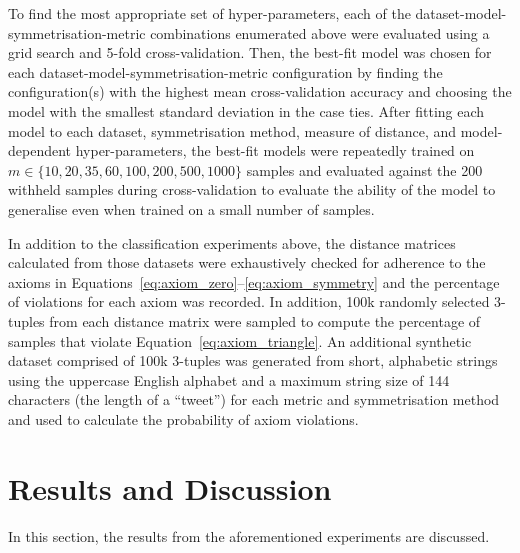\documentclass[preprint,12pt]{article}
\begin{document}
To find the most appropriate set of hyper-parameters, each of the dataset-model-symmetrisation-metric combinations enumerated above were evaluated using a grid search and 5-fold cross-validation.
Then, the best-fit model was chosen for each dataset-model-symmetrisation-metric configuration by finding the configuration(s) with the highest mean cross-validation accuracy and choosing the model with the smallest standard deviation in the case ties.
After fitting each model to each dataset, symmetrisation method, measure of distance, and model-dependent hyper-parameters, the best-fit models were repeatedly trained on $m \in \{10, 20, 35, 60, 100, 200, 500, 1000\}$ samples and evaluated against the 200 withheld samples during cross-validation to evaluate the ability of the model to generalise even when trained on a small number of samples.

In addition to the classification experiments above, the distance matrices calculated from those datasets were exhaustively checked for adherence to the axioms in Equations~\ref{eq:axiom_zero}--\ref{eq:axiom_symmetry} and the percentage of violations for each axiom was recorded.
In addition, 100k randomly selected 3-tuples from each distance matrix were sampled to compute the percentage of samples that violate Equation~\ref{eq:axiom_triangle}.
An additional synthetic dataset comprised of 100k 3-tuples was generated from short, alphabetic strings using the uppercase English alphabet and a maximum string size of 144 characters (the length of a ``tweet'') for each metric and symmetrisation method and used to calculate the probability of axiom violations.


\section{Results and Discussion}
\label{results}

In this section, the results from the aforementioned experiments are discussed.
\end{document}
